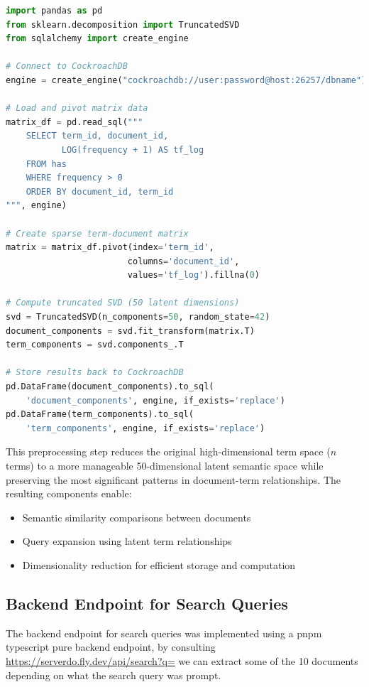 \documentclass[twoside]{article}
\begin{document}
\begin{lstlisting}[language=Python,caption={SVD Computation Script},label={lst:svd}]
import pandas as pd
from sklearn.decomposition import TruncatedSVD
from sqlalchemy import create_engine

# Connect to CockroachDB
engine = create_engine("cockroachdb://user:password@host:26257/dbname")

# Load and pivot matrix data
matrix_df = pd.read_sql("""
    SELECT term_id, document_id, 
           LOG(frequency + 1) AS tf_log 
    FROM has 
    WHERE frequency > 0
    ORDER BY document_id, term_id
""", engine)

# Create sparse term-document matrix
matrix = matrix_df.pivot(index='term_id', 
                        columns='document_id',
                        values='tf_log').fillna(0)

# Compute truncated SVD (50 latent dimensions)
svd = TruncatedSVD(n_components=50, random_state=42)
document_components = svd.fit_transform(matrix.T)
term_components = svd.components_.T

# Store results back to CockroachDB
pd.DataFrame(document_components).to_sql(
    'document_components', engine, if_exists='replace')
pd.DataFrame(term_components).to_sql(
    'term_components', engine, if_exists='replace')
\end{lstlisting}

This preprocessing step reduces the original high-dimensional term space (${n}$ terms) to a more manageable 50-dimensional latent semantic space while preserving the most significant patterns in document-term relationships. The resulting components enable:

\begin{itemize}
    \item Semantic similarity comparisons between documents
    \item Query expansion using latent term relationships
    \item Dimensionality reduction for efficient storage and computation
\end{itemize}

\subsection{Backend Endpoint for Search Queries}
The backend endpoint for search queries was implemented using a pnpm typescript pure backend endpoint, by consulting \url{https://serverdo.fly.dev/api/search?q=} we can extract some of the 10 documents depending on what the search query was prompt.
\end{document}
